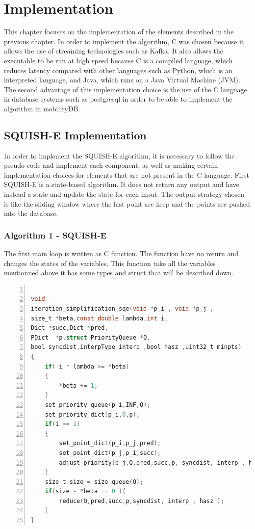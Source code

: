 
\chapter{Implementation}
This chapter focuses on the implementation of the elements described in the previous chapter. In order to implement the algorithm, C was chosen because it allows the use of streaming technologies such as Kafka. It also allows the executable to be run at high speed because C is a compiled language, which reduces latency compared with other languages such as Python, which is an interpreted language, and Java, which runs on a Java Virtual Machine (JVM). The second advantage of this implementation choice is the use of the C language in database systems such as postgresql in order to be able to implement the algorithm in mobilityDB.  

\section{SQUISH-E Implementation}
In order to implement the SQUISH-E algorithm, it is necessary to follow the pseudo code and implement each component, as well as making certain implementation choices for elements that are not present in the C language. First SQUISH-E is a state-based algorithm. It does not return any output and have instead a state and update the state for each input. The output strategy chosen is like the sliding window where the last point are keep and the points are pushed into the database. 

\subsection{Algorithm 1 - SQUISH-E}

The first main loop is written as C function. The function have no return and changes the states of the variables.  This function take all the variables mentionned above it has some types and struct that will be described down. 

\begin{minipage}{\linewidth}
\begin{lstlisting}[language=C, % Spécifie le langage du code
caption={SQUISH-E}, % Légende du listing
label=lst:squish_c, % Étiquette pour référencer le listing
numbers=left,
numberstyle=\tiny\color{gray},
stepnumber=1,
frame=single,
breaklines=true,
postbreak=\mbox{\textcolor{red}{$\hookrightarrow$}\space},
showstringspaces=false
]

void
iteration_simplification_sqe(void *p_i , void *p_j ,
size_t *beta,const double lambda,int i,
Dict *succ,Dict *pred,
PDict  *p,struct PriorityQueue *Q,
bool syncdist,interpType interp ,bool hasz ,uint32_t minpts)
{
	if( i * lambda >= *beta)
	{
		*beta += 1;
	}
	set_priority_queue(p_i,INF,Q);
	set_priority_dict(p_i,0,p);
	if(i >= 1)
	{
		set_point_dict(p_i,p_j,pred);
		set_point_dict(p_j,p_i,succ);
		adjust_priority(p_j,Q,pred,succ,p, syncdist, interp , hasz );
	}
	size_t size = size_queue(Q);
	if(size - *beta == 0 ){
		reduce(Q,pred,succ,p,syncdist, interp , hasz );
	}
}
\end{lstlisting}
\end{minipage}

